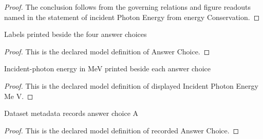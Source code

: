 \begin{proof}
  The conclusion follows from the governing relations and figure readouts named in the statement of incident Photon Energy from energy Conservation.
\end{proof}
\begin{definition}
  \label{def:physics:phyx-mini-0613:phyxminiproblems-problemphyxmini0613-answerchoice}
  Labels printed beside the four answer choices
\end{definition}
\begin{proof}
  This is the declared model definition of Answer Choice.
\end{proof}
\begin{definition}
  \label{def:physics:phyx-mini-0613:phyxminiproblems-problemphyxmini0613-displayedincidentphotonenergymev}
  Incident-photon energy in MeV printed beside each answer choice
\end{definition}
\begin{proof}
  This is the declared model definition of displayed Incident Photon Energy Me V.
\end{proof}
\begin{definition}
  \label{def:physics:phyx-mini-0613:phyxminiproblems-problemphyxmini0613-recordedanswerchoice}
  Dataset metadata records answer choice A
\end{definition}
\begin{proof}
  This is the declared model definition of recorded Answer Choice.
\end{proof}
